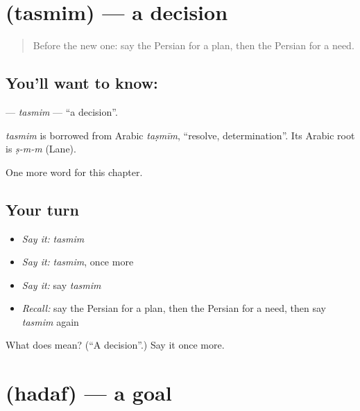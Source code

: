 \section[\texorpdfstring{\fa{تصمیم} (tasmim)}{تصمیم (tasmim)}]{ (tasmim) — a decision}

\label{lesson:FA-C91-tasmim}



\begin{quote}
Before the new one: say the Persian for a plan, then the Persian for a need.
\end{quote}

\subsection*{You'll want to know: }
\textbf{} — \emph{tasmim} — \textquotedblleft{}a decision\textquotedblright{}.

\begin{cousinweb}
\emph{tasmim} is borrowed from Arabic \emph{taṣmīm}, \textquotedblleft{}resolve, determination\textquotedblright{}. Its Arabic root is \emph{ṣ-m-m} (Lane).
\end{cousinweb}

\begin{grammarlens}[title={What you've built}]
One more word for this chapter.
\end{grammarlens}

\subsection*{Your turn}
\begin{itemize}
\raggedright
  \item \emph{Say it:} \emph{tasmim}
  \item \emph{Say it:} \emph{tasmim}, once more
  \item \emph{Say it:} say \emph{tasmim}
  \item \emph{Recall:} say the Persian for a plan, then the Persian for a need, then say \emph{tasmim} again
\end{itemize}

\begin{tcolorbox}[breakable,colback=teal!4,colframe=teal!35!black,title={Before you move on}]
What does  mean? (\textquotedblleft{}A decision\textquotedblright{}.) Say it once more.
\end{tcolorbox}
\section[\texorpdfstring{\fa{هدف} (hadaf)}{هدف (hadaf)}]{ (hadaf) — a goal}

